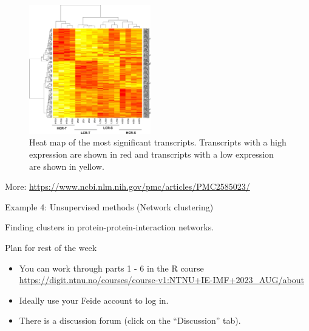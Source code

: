 \documentclass[
  10pt,
  ignorenonframetext,
]{beamer}
\providecommand{\tightlist}{%
  \setlength{\itemsep}{0pt}\setlength{\parskip}{0pt}}
\begin{document}
\begin{frame}
\begin{figure}
\includegraphics[width=150pt]{heatmap} \caption{Heat map of the most significant transcripts. Transcripts with a high expression are shown in red and transcripts with a low expression are shown in yellow.}\label{fig:heatmap_pic}
\end{figure}

\tiny

More: \url{https://www.ncbi.nlm.nih.gov/pmc/articles/PMC2585023/}
\end{frame}

\begin{frame}{Example 4: Unsupervised methods (Network clustering)}
\protect\hypertarget{example-4-unsupervised-methods-network-clustering}{}
\vspace{2mm}

Finding clusters in protein-protein-interaction networks. \vspace{2mm}
\end{frame}

\begin{frame}{Plan for rest of the week}
\protect\hypertarget{plan-for-rest-of-the-week}{}
\(~\)

\begin{itemize}
\tightlist
\item
  You can work through parts 1 - 6 in the R course
  \url{https://digit.ntnu.no/courses/course-v1:NTNU+IE-IMF+2023_AUG/about}
\end{itemize}

\vspace{2mm}

\begin{itemize}
\tightlist
\item
  Ideally use your Feide account to log in.
\end{itemize}

\vspace{2mm}

\begin{itemize}
\tightlist
\item
  There is a discussion forum (click on the ``Discussion'' tab).
\end{itemize}
\end{frame}
\end{document}
